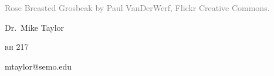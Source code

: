 \documentclass[t,handout]{beamer}  %
\begin{document}


{
\begin{frame}[b,plain]
	\tiny\textcolor{gray}{Rose Breasted Grosbeak by Paul VanDerWerf, Flickr Creative Commons.}
\end{frame}
}

{
\begin{frame}[t]
	\large
	\vspace{2ex}
	\hangpara\hspace{15em} Dr.~Mike Taylor

	\hangpara\hspace{15em} \textsc{rh} 217
	


	\hangpara\hspace{15em} mtaylor@semo.edu
	

\end{frame}
}


%
%
%
%
%
\end{document}
